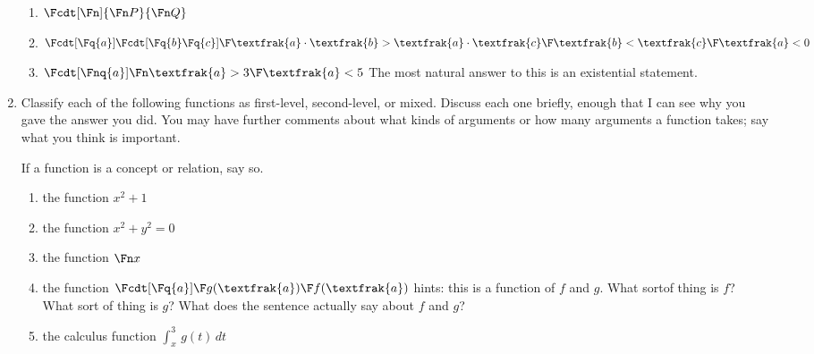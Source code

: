 \documentclass[12pt]{article}
\begin{document}
\begin{enumerate}
\begin{enumerate}

\item  $\Fcdt[\Fn]{\Fn P}{\Fn Q}$

\item  $\Fcdt[\Fq{a}]{\Fcdt[\Fq{b}\Fq{c}]{\F \textfrak{a}\cdot \textfrak {b} > \textfrak{a} \cdot \textfrak{c}}{\F \textfrak{b} < \textfrak{c}}}{\F \textfrak{a} < 0}$

\item $\Fcdt[\Fnq{a}]{\Fn \textfrak{a} > 3}{\F \textfrak{a} <5}$  The most natural answer to this is an existential statement.

\end{enumerate}

\item  Classify each of the following functions as first-level, second-level, or mixed.  Discuss each one briefly, enough that I can see why you gave the answer you did.
You may have further comments about what kinds of arguments or how many arguments a function takes;  say what you think is important.

If a function is a concept or relation, say so.

\begin{enumerate}

\item the function $x^2+1$

\item the function $x^2+y^2=0$

\item the function $\Fn x$

\item the function $\Fcdt[\Fq{a}]{\F g(\textfrak{a})}{\F f(\textfrak{a})}$  hints:  this is a function of $f$ and $g$.  What sortof thing is $f$?  What sort of thing is $g$?
What does the sentence actually say about $f$ and $g$?

\item the calculus function $\int_x^3\,g(t)\,dt$

\end{enumerate}

\end{enumerate}
\end{document}
